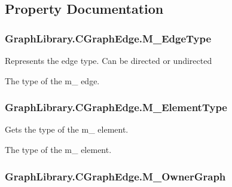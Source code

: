 \subsection{Property Documentation}
\hypertarget{class_graph_library_1_1_c_graph_edge_aeee79cda191cc06d78688848f6168e8c}{}
\subsubsection[{M\+\_\+\+Edge\+Type}]{ Graph\+Library.\+C\+Graph\+Edge.\+M\+\_\+\+Edge\+Type\hspace{0.3cm}{\ttfamily [get]}}\label{class_graph_library_1_1_c_graph_edge_aeee79cda191cc06d78688848f6168e8c}


Represents the edge type. Can be directed or undirected 

The type of the m\+\_\+ edge. \hypertarget{class_graph_library_1_1_c_graph_edge_a43275553517bb0104bfdfc7ea14984ea}{}
\subsubsection[{M\+\_\+\+Element\+Type}]{ Graph\+Library.\+C\+Graph\+Edge.\+M\+\_\+\+Element\+Type\hspace{0.3cm}{\ttfamily [get]}}\label{class_graph_library_1_1_c_graph_edge_a43275553517bb0104bfdfc7ea14984ea}


Gets the type of the m\+\_\+ element. 

The type of the m\+\_\+ element. \hypertarget{class_graph_library_1_1_c_graph_edge_a59088a897b7cee66d1425b65e6bb945b}{}
\subsubsection[{M\+\_\+\+Owner\+Graph}]{ Graph\+Library.\+C\+Graph\+Edge.\+M\+\_\+\+Owner\+Graph\hspace{0.3cm}{\ttfamily [get]}}\label{class_graph_library_1_1_c_graph_edge_a59088a897b7cee66d1425b65e6bb945b}


